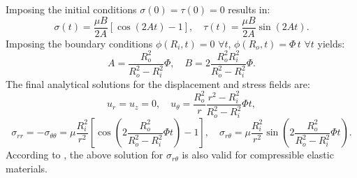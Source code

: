 Imposing the initial conditions $\sigma(0) = \tau(0) = 0$ results in:
\begin{equation}
  \sigma(t) = \frac{\mu B}{2 A} \left[ \cos (2 A t) - 1 \right], \quad \tau(t) = \frac{\mu B}{2 A} \sin (2 A t).
\end{equation}
Imposing the boundary conditions $\phi(R_i,t) = 0 \, \, \forall t$, $\phi(R_o,t) = \Phi \, t \, \, \forall t$ yields:
\begin{equation}
  A = \frac{R_o^{2}}{R_o^{2} - R_i^{2}} \Phi, \quad B = 2 \frac{R_o^{2} R_i^{2}}{R_o^{2} - R_i^{2}} \Phi.
\end{equation}
The final analytical solutions for the displacement and stress fields are:
\begin{equation}
  u_r = u_z = 0, \quad u_\theta = \frac{R_o^2}{r} \frac{r^2 - R_i^2}{R_o^{2} - R_i^{2}} \Phi t,
\end{equation}
\begin{equation}
  \sigma_{rr} = - \sigma_{\theta \theta} = \mu \frac{R_i^{2}}{r^{2}} \left[ \cos \left( 2 \frac{R_o^{2}}{R_o^{2} - R_i^{2}} \Phi t \right) - 1 \right], \quad \sigma_{r \theta} = \mu \frac{R_i^{2}}{r^{2}} \sin \left( 2 \frac{R_o^{2}}{R_o^{2} - R_i^{2}} \Phi t \right).
\end{equation}
According to \cite{Brannon:11}, the above solution for $\sigma_{r \theta}$ is also valid for compressible elastic materials.